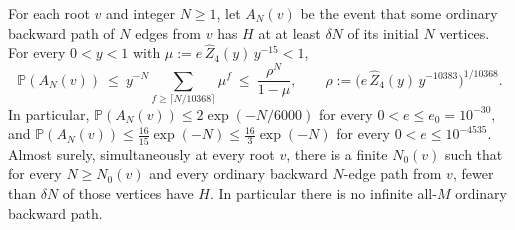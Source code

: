 \begin{lemma}\label{ld:density}
For each root $v$ and integer $N\ge1$, let $A_N(v)$ be the event that some ordinary backward path of
$N$ edges from $v$ has $H$ at at least $\delta N$ of its initial $N$ vertices. For every $0<y<1$ with
$\mu:=e\,\widehat Z_4(y)\,y^{-15}<1$,
\begin{equation}\label{ld:densitybound}
  \mathbb{P}(A_N(v))\ \le\ y^{-N}\!\!\sum_{f\ge\lceil N/10368\rceil}\!\!\mu^f
  \ \le\ \frac{\rho^N}{1-\mu},\qquad
  \rho:=\bigl(e\,\widehat Z_4(y)\,y^{-10383}\bigr)^{1/10368}.
\end{equation}
In particular, $\mathbb{P}(A_N(v))\le2\exp(-N/6000)$ for every $0<e\le e_0=10^{-30}$, and
$\mathbb{P}(A_N(v))\le\frac{16}{15}\exp(-N)\le\frac{16}{3}\exp(-N)$ for every $0<e\le10^{-4535}$.
Almost surely, simultaneously at every root $v$, there is a finite $N_0(v)$ such that for every
$N\ge N_0(v)$ and every ordinary backward $N$-edge path from $v$, fewer than $\delta N$ of those
vertices have $H$. In particular there is no infinite all-$M$ ordinary backward path.
\end{lemma}

